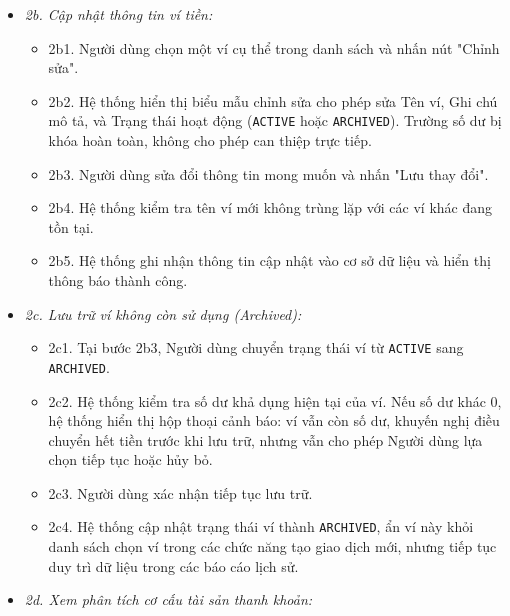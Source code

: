 \documentclass[11pt,a4paper]{article}
\providecommand{\tightlist}{
  \setlength{\itemsep}{0pt}\setlength{\parskip}{0pt}}
\begin{document}
\begin{itemize}
\begin{itemize}
    \begin{itemize}
    \tightlist
    \item
      2a1. Người dùng mở màn hình danh sách ví, tùy chọn áp dụng bộ lọc
      trạng thái (\texttt{ACTIVE}, \texttt{ARCHIVED}, hoặc
      \texttt{ALL}).
    \item
      2a2. Hệ thống quét toàn bộ lịch sử dòng tiền của từng ví thỏa mãn
      điều kiện lọc, áp dụng công thức \texttt{BR-FIN-02} để tính số dư
      khả dụng thực tế tại thời điểm truy vấn.
    \item
      2a3. Hệ thống tổng hợp tổng số dư tiền mặt thanh khoản bằng phương
      thức \texttt{BigDecimal.add()}.
    \item
      2a4. Hệ thống hiển thị danh sách ví kèm số dư động, loại ví, trạng
      thái và tổng số dư khả dụng toàn hệ thống ở chân danh sách.
    \end{itemize}
  \item
    \emph{2b. Cập nhật thông tin ví tiền:}

    \begin{itemize}
    \tightlist
    \item
      2b1. Người dùng chọn một ví cụ thể trong danh sách và nhấn nút
      "Chỉnh sửa".
    \item
      2b2. Hệ thống hiển thị biểu mẫu chỉnh sửa cho phép sửa Tên ví, Ghi
      chú mô tả, và Trạng thái hoạt động (\texttt{ACTIVE} hoặc
      \texttt{ARCHIVED}). Trường số dư bị khóa hoàn toàn, không cho phép
      can thiệp trực tiếp.
    \item
      2b3. Người dùng sửa đổi thông tin mong muốn và nhấn "Lưu thay
      đổi".
    \item
      2b4. Hệ thống kiểm tra tên ví mới không trùng lặp với các ví khác
      đang tồn tại.
    \item
      2b5. Hệ thống ghi nhận thông tin cập nhật vào cơ sở dữ liệu và
      hiển thị thông báo thành công.
    \end{itemize}
  \item
    \emph{2c. Lưu trữ ví không còn sử dụng (Archived):}

    \begin{itemize}
    \tightlist
    \item
      2c1. Tại bước 2b3, Người dùng chuyển trạng thái ví từ
      \texttt{ACTIVE} sang \texttt{ARCHIVED}.
    \item
      2c2. Hệ thống kiểm tra số dư khả dụng hiện tại của ví. Nếu số dư
      khác 0, hệ thống hiển thị hộp thoại cảnh báo: ví vẫn còn số dư,
      khuyến nghị điều chuyển hết tiền trước khi lưu trữ, nhưng vẫn cho
      phép Người dùng lựa chọn tiếp tục hoặc hủy bỏ.
    \item
      2c3. Người dùng xác nhận tiếp tục lưu trữ.
    \item
      2c4. Hệ thống cập nhật trạng thái ví thành \texttt{ARCHIVED}, ẩn
      ví này khỏi danh sách chọn ví trong các chức năng tạo giao dịch
      mới, nhưng tiếp tục duy trì dữ liệu trong các báo cáo lịch sử.
    \end{itemize}
  \item
    \emph{2d. Xem phân tích cơ cấu tài sản thanh khoản:}


\end{itemize}
\end{itemize}
\end{document}
